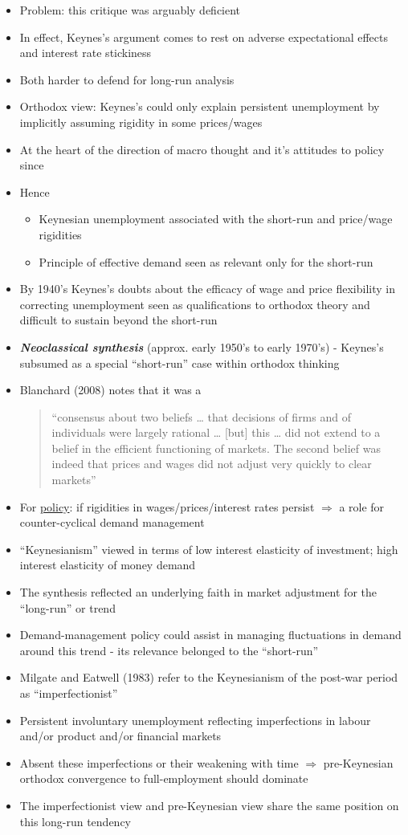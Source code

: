 \documentclass[a4paper,twoside]{article}
\numberwithin{equation}{section}
\numberwithin{figure}{section}
\begin{document}
\begin{itemize}
			\item Problem: this critique was arguably deficient
			\item In effect, Keynes's argument comes to rest on adverse expectational effects and interest rate stickiness
			\item Both harder to defend for long-run analysis
			\item Orthodox view: Keynes's could only explain persistent unemployment by implicitly assuming rigidity in some prices/wages
			\item At the heart of the direction of macro thought and it's attitudes to policy since 
			\item Hence
			\begin{itemize}
				\item Keynesian unemployment associated with the short-run and price/wage rigidities 
				\item Principle of effective demand seen as relevant only for the short-run
			\end{itemize}
		\item By 1940's Keynes's doubts about the efficacy of wage and price flexibility in correcting unemployment seen as qualifications to orthodox theory and difficult to sustain beyond the short-run
		\item \textbf{\textit{Neoclassical synthesis}} (approx. early 1950's to early 1970's) -  Keynes's subsumed as a special ``short-run'' case within orthodox thinking
		\item Blanchard (2008) notes that it was a
		\begin{quote}
			``consensus about two beliefs … that decisions of firms and of individuals were largely rational … [but] this … did not extend to a belief in the efficient functioning of markets. The second belief was indeed that prices and wages did not adjust very quickly to clear markets''
		\end{quote}
		\item For \underline{policy}: if rigidities in wages/prices/interest rates persist \( \Rightarrow \) a role for counter-cyclical demand management
		\item ``Keynesianism'' viewed in terms of low interest elasticity of investment; high interest elasticity of money demand
		\item The synthesis reflected an underlying faith in market adjustment for the “long-run'' or trend
		\item Demand-management policy could assist in managing fluctuations in demand around this trend - its relevance belonged to the “short-run''
		\item Milgate and Eatwell (1983) refer to the Keynesianism of the post-war period as ``imperfectionist''
		\item Persistent involuntary unemployment reflecting imperfections in labour and/or product and/or financial markets
		\item Absent these imperfections or their weakening with time \( \Rightarrow \) pre-Keynesian orthodox convergence to full-employment should dominate
		\item The imperfectionist view and pre-Keynesian view share the same position on this long-run tendency
	\end{itemize}
\end{document}
